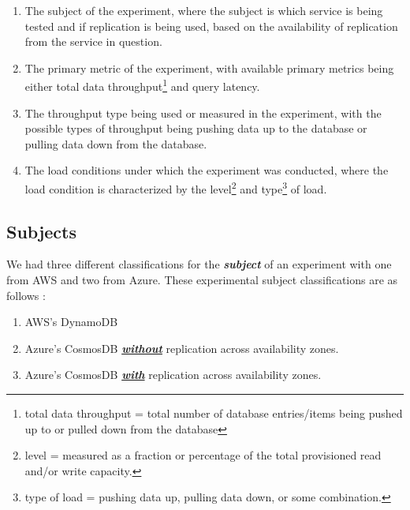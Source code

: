 \vspace{0.1in}
\begin{spacing}{1.2}
\begin{enumerate}[label=\large{\textbf{\arabic*}):}]
	\item The subject of the experiment, where the subject is which service is being tested and if replication is being used, based on the availability of replication from the service in question.
	\vspace{0.05in}
	\item The primary metric of the experiment, with available primary metrics being either total data throughput\footnote{total data throughput = total number of database entries/items being pushed up to or pulled down from the database} and query latency.
	\vspace{0.05in}
	\item The throughput type being used or measured in the experiment, with the possible types of throughput being pushing data up to the database or pulling data down from the database.
	\vspace{0.05in}
	\item The load conditions under which the experiment was conducted, where the load condition is characterized by the level\footnote{level = measured as a fraction or percentage of the total provisioned read and/or write capacity.} and type\footnote{type of load = pushing data up, pulling data down, or some combination.} of load.
\end{enumerate}
\end{spacing}



\subsection{Subjects}

We had three different classifications for the \emph{\textbf{subject}} of an experiment with one from AWS and two from Azure.  These experimental subject classifications are as follows : 

\vspace{0.1in}
\begin{spacing}{1.2}
\begin{enumerate}[label=\large{\textbf{1-\alph*}):}]
	\item AWS's DynamoDB
	\vspace{0.05in}
	\item Azure's CosmosDB \textbf{\underline{\emph{without}}} replication across availability zones.
	\vspace{0.05in}
	\item Azure's CosmosDB \textbf{\underline{\emph{with}}} replication across availability zones.
\end{enumerate}
\end{spacing}


